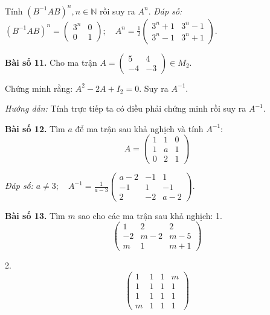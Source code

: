     Tính \((B^{-1}AB)^n, n \in \mathbb{N}\) rồi suy ra \(A^n\).
    \textit{Đáp số:} \((B^{-1}AB)^n = \begin{pmatrix}
        3^n & 0 \\
        0 & 1
        \end{pmatrix}; \quad A^n = \frac{1}{2} \begin{pmatrix}
        3^n + 1 & 3^n - 1 \\
        3^n - 1 & 3^n + 1
        \end{pmatrix}\).
        
        \textbf{Bài số 11.} Cho ma trận \(A = \begin{pmatrix}
        5 & 4 \\
        -4 & -3
        \end{pmatrix} \in M_2 \).
        
        Chứng minh rằng: \(A^2 - 2A + I_2 = 0\). Suy ra \(A^{-1}\).
        
        \textit{Hướng dẫn:} Tính trực tiếp ta có điều phải chứng minh rồi suy ra \(A^{-1}\).
        
        \textbf{Bài số 12.} Tìm \(a\) để ma trận sau khả nghịch và tính \(A^{-1}\):
        \[
        A = \begin{pmatrix}
        1 & 1 & 0 \\
        1 & a & 1 \\
        0 & 2 & 1
        \end{pmatrix}
        \]
        
        \textit{Đáp số:} \(a \neq 3; \quad A^{-1} = \frac{1}{a - 3} \begin{pmatrix}
        a - 2 & -1 & 1 \\
        -1 & 1 & -1 \\
        2 & -2 & a - 2
        \end{pmatrix}\).
        
        \textbf{Bài số 13.} Tìm \(m\) sao cho các ma trận sau khả nghịch:
        1.
        \[
        \begin{pmatrix}
        1 & 2 & 2 \\
        -2 & m - 2 & m - 5 \\
        m & 1 & m + 1
        \end{pmatrix}
        \]
        
        2.
        \[
        \begin{pmatrix}
        1 & 1 & 1 & m \\
        1 & 1 & 1 & 1 \\
        1 & 1 & 1 & 1 \\
        m & 1 & 1 & 1
        \end{pmatrix}
        \]
        

